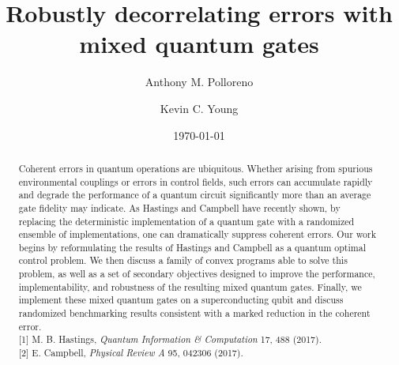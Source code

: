 \documentclass[aps,nofootinbib,pra,notitlepage,twocolumn]{revtex4-1}
\newcommand{\0}{\ensuremath{\mathbf{0}}}
\begin{document}
\title{Robustly decorrelating errors with mixed quantum gates}

\author{Anthony M. Polloreno}
\author{Kevin C. Young}

\date{\today}

\begin{abstract}
\noindent Coherent errors in quantum operations are ubiquitous. Whether arising from spurious environmental couplings or errors in control fields, such errors can accumulate rapidly and degrade the performance of a quantum circuit significantly more than an average gate fidelity may indicate. As Hastings \cite{Hastings2017} and Campbell \cite{Campbell2017} have recently shown, by replacing the deterministic implementation of a quantum gate with a randomized ensemble of implementations, one can dramatically suppress coherent errors. Our work begins by reformulating the results of Hastings and Campbell as a quantum optimal control problem. We then discuss a family of convex programs able to solve this problem, as well as a set of secondary objectives designed to improve the performance, implementability, and robustness of the resulting mixed quantum gates. Finally, we implement these mixed quantum gates on a superconducting qubit and discuss randomized benchmarking results consistent with a marked reduction in the coherent error.\\
{[1]} M. B. Hastings, \emph{Quantum Information \& Computation} 17, 488 (2017). \\
{[2]} E. Campbell, \emph{Physical Review A} 95, 042306 (2017).
\end{abstract}

\pacs{}

\maketitle


\end{document}
